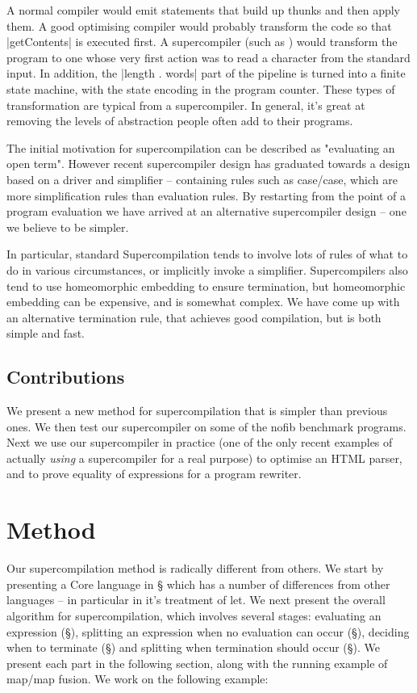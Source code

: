 \documentclass{sigplanconf}
\begin{document}
A normal compiler would emit statements that build up thunks and then apply them. A good optimising compiler would probably transform the code so that |getContents| is executed first. A supercompiler (such as \cite{me:ifl2007}) would transform the program to one whose very first action was to read a character from the standard input. In addition, the |length . words| part of the pipeline is turned into a finite state machine, with the state encoding in the program counter. These types of transformation are typical from a supercompiler. In general, it's great at removing the levels of abstraction people often add to their programs.

The initial motivation for supercompilation can be described as "evaluating an open term". However recent supercompiler design has graduated towards a design based on a driver and simplifier -- containing rules such as case/case, which are more simplification rules than evaluation rules. By restarting from the point of a program evaluation we have arrived at an alternative supercompiler design -- one we believe to be simpler.

In particular, standard Supercompilation tends to involve lots of rules of what to do in various circumstances, or implicitly invoke a simplifier. Supercompilers also tend to use homeomorphic embedding to ensure termination, but homeomorphic embedding can be expensive, and is somewhat complex. We have come up with an alternative termination rule, that achieves good compilation, but is both simple and fast.

\subsection{Contributions}

We present a new method for supercompilation that is simpler than previous ones. We then test our supercompiler on some of the nofib benchmark programs. Next we use our supercompiler in practice (one of the only recent examples of actually \textit{using} a supercompiler for a real purpose) to optimise an HTML parser, and to prove equality of expressions for a program rewriter.

\section{Method}

Our supercompilation method is radically different from others. We start by presenting a Core language in \S\label{sec:core} which has a number of differences from other languages -- in particular in it's treatment of let. We next present the overall algorithm for supercompilation, which involves several stages: evaluating an expression (\S\label{sec:evaluation}), splitting an expression when no evaluation can occur (\S\label{sec:splitting}), deciding when to terminate (\S\label{sec:termination}) and splitting when termination should occur (\S\label{sec:splitterm}). We present each part in the following section, along with the running example of map/map fusion. We work on the following example:
\end{document}

